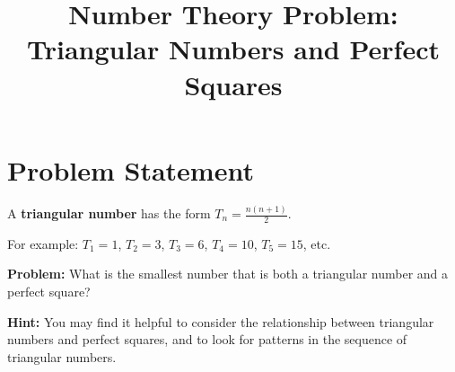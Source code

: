 \documentclass[12pt]{article}
\title{Number Theory Problem: Triangular Numbers and Perfect Squares}
\author{}
\date{}
\begin{document}
\maketitle

\section*{Problem Statement}

A \textbf{triangular number} has the form $T_n = \frac{n(n+1)}{2}$.

For example: $T_1 = 1$, $T_2 = 3$, $T_3 = 6$, $T_4 = 10$, $T_5 = 15$, etc.

\textbf{Problem:} What is the smallest number that is both a triangular number and a perfect square?

\vspace{0.5cm}

\textbf{Hint:} You may find it helpful to consider the relationship between triangular numbers and perfect squares, and to look for patterns in the sequence of triangular numbers.
\end{document}
